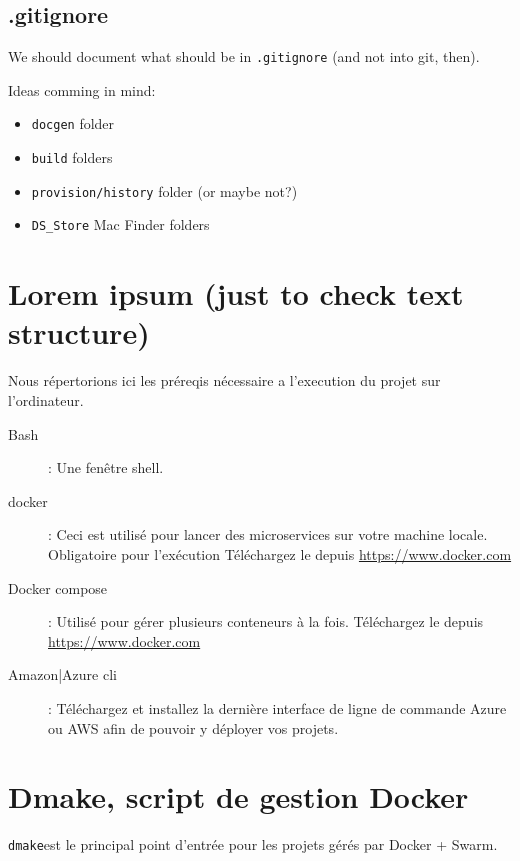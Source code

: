 \subsection{.gitignore}

We should document what should be in \texttt{.gitignore} (and not into git, then).

Ideas comming in mind:

\begin{itemize}
    \item \texttt{docgen} folder
    \item \texttt{build} folders
    \item \texttt{provision/history} folder (or maybe not?)
    \item \texttt{DS\_Store} Mac Finder folders
\end{itemize}

\section{Lorem ipsum (just to check text structure)}

\lipsum

Nous répertorions ici les préreqis nécessaire a l'execution du projet sur l'ordinateur.

\begin{description}
    \item[Bash]: Une fenêtre shell.
    \item[\gls{docker}]: Ceci est utilisé pour lancer des microservices sur votre machine locale.
        Obligatoire pour l'exécution
        Téléchargez le depuis \url{https://www.docker.com}
    \item[Docker compose]: Utilisé pour gérer plusieurs conteneurs à la fois.
        Téléchargez le depuis \url{https://www.docker.com}
    \item[Amazon|Azure \gls{cli}]: Téléchargez et installez la dernière interface de ligne de commande
        Azure ou AWS afin de pouvoir y déployer vos projets.
\end{description}

\section{Dmake, script de gestion Docker}

\texttt{dmake}\footnotemark est le principal point d’entrée pour les projets gérés par Docker + Swarm.

